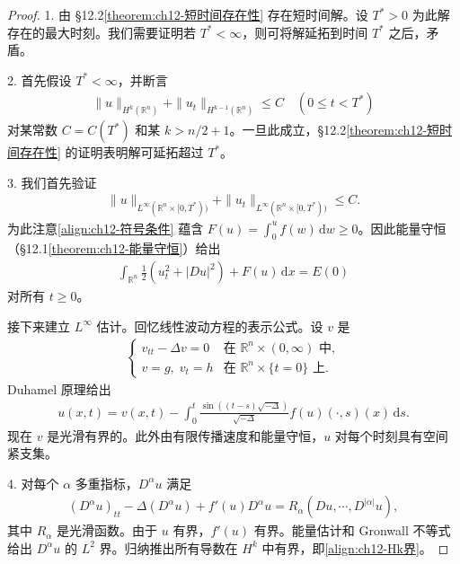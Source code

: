 \documentclass[../../main.tex]{subfiles}
\begin{document}
\begin{proof}
1. 由 \S12.2\cref{theorem:ch12-短时间存在性} 存在短时间解。设 $T^*>0$ 为此解存在的最大时刻。我们需要证明若 $T^*<\infty$，则可将解延拓到时间 $T^*$ 之后，矛盾。

2. 首先假设 $T^*<\infty$，并断言
\begin{align}
\|u\|_{H^k(\mathbb{R}^n)}+\|u_t\|_{H^{k-1}(\mathbb{R}^n)}\leqslant C \quad (0\leqslant t<T^*)
\label{align:ch12-Hk界}
\end{align}
对某常数 $C=C(T^*)$ 和某 $k>n/2+1$。一旦此成立，\S12.2\cref{theorem:ch12-短时间存在性} 的证明表明解可延拓超过 $T^*$。

3. 我们首先验证
\begin{align}
\|u\|_{L^\infty(\mathbb{R}^n\times[0,T^*))}+\|u_t\|_{L^\infty(\mathbb{R}^n\times[0,T^*))}\leqslant C.
\label{align:ch12-Linfty界}
\end{align}
为此注意\eqref{align:ch12-符号条件} 蕴含 $F(u)=\int_0^uf(w)\,\mathrm{d}w\geqslant 0$。因此能量守恒（\S12.1\cref{theorem:ch12-能量守恒}）给出
\begin{align}
\int_{\mathbb{R}^n}\frac{1}{2}(u_t^2+|Du|^2)+F(u)\,\mathrm{d}x=E(0)
\label{align:ch12-能量守恒2}
\end{align}
对所有 $t\geqslant 0$。

接下来建立 $L^\infty$ 估计。回忆线性波动方程的表示公式。设 $v$ 是
\begin{align}
\begin{cases}
v_{tt}-\Delta v=0 & \text{在 } \mathbb{R}^n\times(0,\infty) \text{ 中},\\
v=g,\;v_t=h & \text{在 } \mathbb{R}^n\times\{t=0\} \text{ 上}.
\end{cases}
\label{align:ch12-线性波动初值}
\end{align}
Duhamel 原理给出
\begin{align}
u(x,t)=v(x,t)-\int_0^t\frac{\sin((t-s)\sqrt{-\Delta})}{\sqrt{-\Delta}}f(u)(\cdot,s)(x)\,\mathrm{d}s.
\label{align:ch12-Duhamel}
\end{align}
现在 $v$ 是光滑有界的。此外由有限传播速度和能量守恒，$u$ 对每个时刻具有空间紧支集。

4. 对每个 $\alpha$ 多重指标，$D^\alpha u$ 满足
\begin{align*}
(D^\alpha u)_{tt}-\Delta(D^\alpha u)+f'(u)D^\alpha u=R_\alpha(Du,\cdots,D^{|\alpha|}u),
\end{align*}
其中 $R_\alpha$ 是光滑函数。由于 $u$ 有界，$f'(u)$ 有界。能量估计和 Gronwall 不等式给出 $D^\alpha u$ 的 $L^2$ 界。归纳推出所有导数在 $H^k$ 中有界，即\eqref{align:ch12-Hk界}。
\end{proof}
\end{document}
